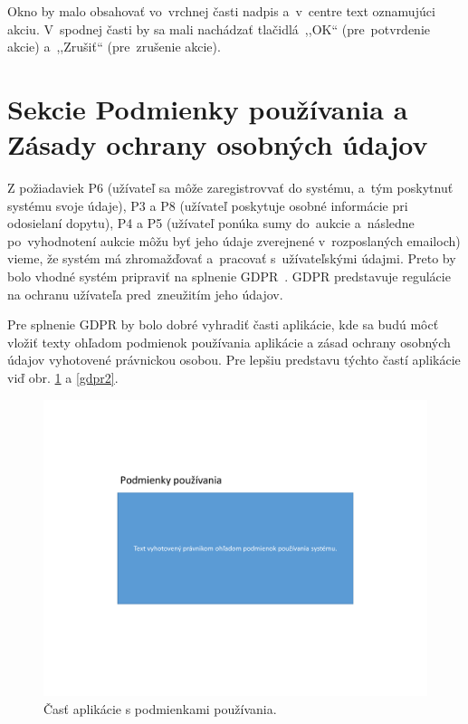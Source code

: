 Okno by malo obsahovať vo~vrchnej časti nadpis a~v~centre text oznamujúci akciu. V~spodnej časti by sa mali nachádzať tlačidlá~,,OK`` (pre~potvrdenie akcie) a~,,Zrušiť`` (pre~zrušenie akcie).

\section{Sekcie Podmienky používania a Zásady ochrany osobných údajov}
\label{gdpr}

Z požiadaviek P6 (užívateľ sa môže zaregistrovvať do systému, a~tým poskytnuť systému svoje údaje), P3 a P8 (užívateľ poskytuje osobné informácie pri odosielaní dopytu), P4 a P5 (užívateľ ponúka sumy do~aukcie a~následne po~vyhodnotení aukcie môžu byť jeho údaje zverejnené v~rozposlaných emailoch) vieme, že systém má zhromažďovať a~pracovať s~užívateľskými údajmi. Preto by bolo vhodné systém pripraviť na splnenie GDPR~\cite{gdpr}. GDPR predstavuje regulácie na ochranu užívateľa pred~zneužitím jeho údajov.

Pre splnenie GDPR by bolo dobré vyhradiť časti aplikácie, kde sa budú môcť vložiť texty ohľadom podmienok používania aplikácie a zásad ochrany osobných údajov vyhotovené právnickou osobou. Pre lepšiu predstavu týchto častí aplikácie viď obr. \ref{gdpr1} a \ref{gdpr2}.

\begin{figure}[H]\centering
\includegraphics[width=140mm]{../img/UI concept/gdpr1}
\caption{Časť aplikácie s podmienkami používania.}
\label{gdpr1}
\end{figure}


